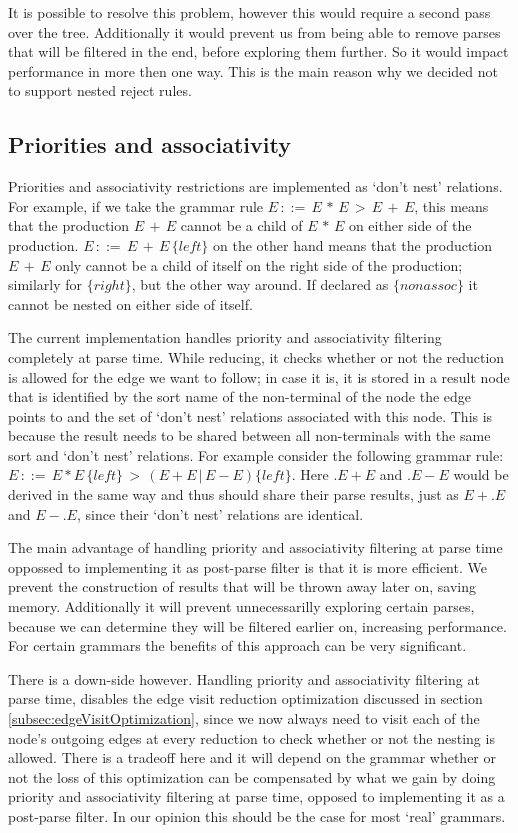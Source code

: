 \documentclass[a4paper,10pt]{article}
\begin{document}
It is possible to resolve this problem, however this would require a second pass over the tree. Additionally it would prevent us from being able to remove parses that will be filtered in the end, before exploring them further. So it would impact performance in more then one way. This is the main reason why we decided not to support nested reject rules.

\subsection{Priorities and associativity}

Priorities and associativity restrictions are implemented as `don't nest' relations. For example, if we take the grammar rule $E\,::=\,E\,*\,E\,>\,E\,+\,E$, this means that the production $E\,+\,E$ cannot be a child of $E\,*\,E$ on either side of the production. $E\,::=\,E\,+\,E\,\{left\}$ on the other hand means that the production $E\,+\,E$ only cannot be a child of itself on the right side of the production; similarly for $\{right\}$, but the other way around. If declared as $\{nonassoc\}$ it cannot be nested on either side of itself.

The current implementation handles priority and associativity filtering completely at parse time. While reducing, it checks whether or not the reduction is allowed for the edge we want to follow; in case it is, it is stored in a result node that is identified by the sort name of the non-terminal of the node the edge points to and the set of `don't nest' relations associated with this node. This is because the result needs to be shared between all non-terminals with the same sort and `don't nest' relations. For example consider the following grammar rule: $E\,::=\,E * E\,\{left\}\,>\,(E + E\,|\,E - E)\{left\}$. Here $.E + E$ and $.E - E$ would be derived in the same way and thus should share their parse results, just as $E+.E$ and $E-.E$, since their `don't nest' relations are identical.

The main advantage of handling priority and associativity filtering at parse time oppossed to implementing it as post-parse filter is that it is more efficient. We prevent the construction of results that will be thrown away later on, saving memory. Additionally it will prevent unnecessarilly exploring certain parses, because we can determine they will be filtered earlier on, increasing performance. For certain grammars the benefits of this approach can be very significant.

There is a down-side however. Handling priority and associativity filtering at parse time, disables the edge visit reduction optimization discussed in section \ref{subsec:edgeVisitOptimization}, since we now always need to visit each of the node's outgoing edges at every reduction to check whether or not the nesting is allowed. There is a tradeoff here and it will depend on the grammar whether or not the loss of this optimization can be compensated by what we gain by doing priority and associativity filtering at parse time, opposed to implementing it as a post-parse filter. In our opinion this should be the case for most `real' grammars.
\end{document}
